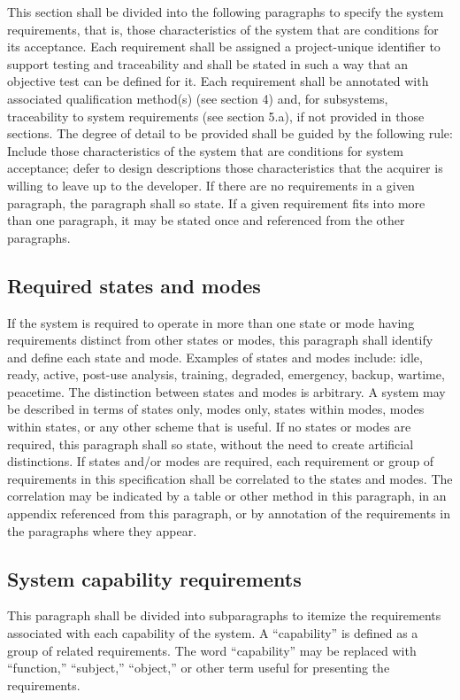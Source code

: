 \documentclass{fidata-report-template}
\begin{document}
This section shall be divided into the following paragraphs to specify
the system requirements, that is, those characteristics of the system
that are conditions for its acceptance. Each requirement shall be
assigned a project-unique identifier to support testing and traceability
and shall be stated in such a way that an objective test can be defined
for it. Each requirement shall be annotated with associated
qualification method(s) (see section 4) and, for subsystems,
traceability to system requirements (see section 5.a), if not provided
in those sections. The degree of detail to be provided shall be guided
by the following rule: Include those characteristics of the system that
are conditions for system acceptance; defer to design descriptions those
characteristics that the acquirer is willing to leave up to the
developer. If there are no requirements in a given paragraph, the
paragraph shall so state. If a given requirement fits into more than one
paragraph, it may be stated once and referenced from the other
paragraphs.

\subsection{Required states and modes}

If the system is required to operate in more than one state or mode
having requirements distinct from other states or modes, this paragraph
shall identify and define each state and mode. Examples of states and
modes include: idle, ready, active, post-use analysis, training,
degraded, emergency, backup, wartime, peacetime. The distinction between
states and modes is arbitrary. A system may be described in terms of
states only, modes only, states within modes, modes within states, or
any other scheme that is useful. If no states or modes are required,
this paragraph shall so state, without the need to create artificial
distinctions. If states and/or modes are required, each requirement or
group of requirements in this specification shall be correlated to the
states and modes. The correlation may be indicated by a table or other
method in this paragraph, in an appendix referenced from this paragraph,
or by annotation of the requirements in the paragraphs where they
appear.

\subsection{System capability requirements}

This paragraph shall be divided into subparagraphs to itemize the
requirements associated with each capability of the system. A
``capability'' is defined as a group of related requirements. The word
``capability'' may be replaced with ``function,'' ``subject,''
``object,'' or other term useful for presenting the requirements.
\end{document}
